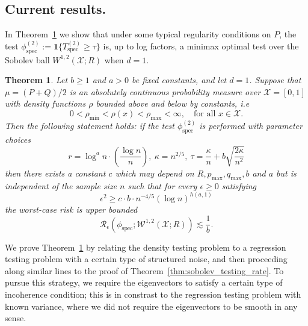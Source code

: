 \documentclass{article}
\newcommand{\1}{\mathbf{1}}
\newcommand{\spec}{\mathrm{spec}}
\theoremstyle{alden}
\theoremstyle{aldenthm}
\newtheorem{theorem}{Theorem}
\theoremstyle{definition}
\theoremstyle{remark}
\begin{document}
\subsection{Current results.}

In Theorem~\ref{thm:twosample_sobolev_testing_rate} we show that under some typical regularity conditions on $P$, the test $\phi_{\textrm{spec}}^{(2)} := \1\{T_{\mathrm{spec}}^{(2)} \geq \tau\}$ is, up to log factors, a minimax optimal test over the Sobolev ball $W^{1,2}(\mathcal{X};R)$ when $d = 1$.

\begin{theorem}
	\label{thm:twosample_sobolev_testing_rate}
	Let $b \geq 1$ and $a > 0$ be fixed constants, and let $d = 1$.  Suppose that $\mu = (P + Q)/2$ is an absolutely continuous probability measure over $\mathcal{X} = [0,1]$ with density functions $\rho$ bounded above and below by constants, i.e
	\begin{equation*}
	0 < \rho_{\min} < \rho(x) < \rho_{\max} < \infty, \quad \textrm{for all $x \in \mathcal{X}$.}
	\end{equation*}
	Then the following statement holds: if the test $\phi_{\spec}^{(2)}$ is performed with parameter choices 
	\begin{equation*}
	r = \log^a n \cdot \left(\frac{\log n}{n}\right), ~\kappa = n^{2/5}, ~\tau = \frac{\kappa}{n} + b\sqrt{\frac{2\kappa}{n^2}}
	\end{equation*}
	then there exists a constant $c$ which may depend on $R,p_{\max},q_{\max},b$ and $a$ but is independent of the sample size $n$ such that for every $\epsilon \geq 0$ satisfying
	\begin{equation}
	\label{eqn:twosample_sobolev_testing_rate}
	\epsilon^2 \geq c \cdot b \cdot n^{-4/5} (\log n)^{h(a,1)}
	\end{equation}
	the worst-case risk is upper bounded
	\begin{equation}
	\label{eqn:twosample_sobolev_testing_rate_1}
	\mathcal{R}_{\epsilon}(\phi_{\mathrm{spec}}; \mathcal{W}^{1,2}(\mathcal{X};R)) \lesssim \frac{1}{b}.
	\end{equation}
\end{theorem}

We prove Theorem~\ref{thm:twosample_sobolev_testing_rate} by relating the density testing problem to a regression testing problem with a certain type of structured noise, and then proceeding along similar lines to the proof of Theorem~\ref{thm:sobolev_testing_rate}. To pursue this strategy, we require the eigenvectors to satisfy a certain type of incoherence condition; this is in constrast to the regression testing problem with known variance, where we did not require the eigenvectors to be smooth in any sense.
\end{document}
